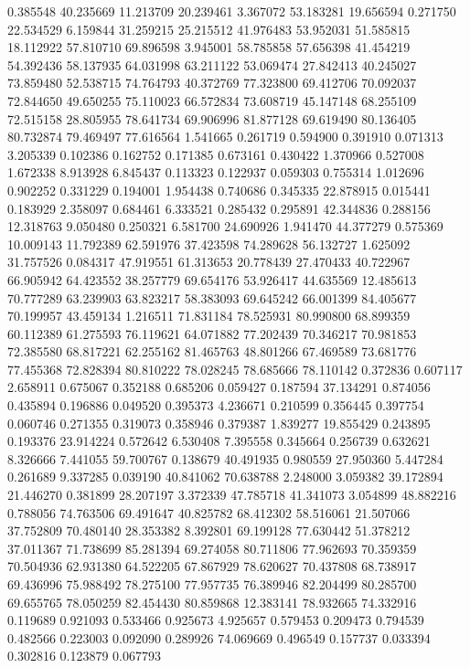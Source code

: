 0.385548
40.235669
11.213709
20.239461
3.367072
53.183281
19.656594
0.271750
22.534529
6.159844
31.259215
25.215512
41.976483
53.952031
51.585815
18.112922
57.810710
69.896598
3.945001
58.785858
57.656398
41.454219
54.392436
58.137935
64.031998
63.211122
53.069474
27.842413
40.245027
73.859480
52.538715
74.764793
40.372769
77.323800
69.412706
70.092037
72.844650
49.650255
75.110023
66.572834
73.608719
45.147148
68.255109
72.515158
28.805955
78.641734
69.906996
81.877128
69.619490
80.136405
80.732874
79.469497
77.616564
1.541665
0.261719
0.594900
0.391910
0.071313
3.205339
0.102386
0.162752
0.171385
0.673161
0.430422
1.370966
0.527008
1.672338
8.913928
6.845437
0.113323
0.122937
0.059303
0.755314
1.012696
0.902252
0.331229
0.194001
1.954438
0.740686
0.345335
22.878915
0.015441
0.183929
2.358097
0.684461
6.333521
0.285432
0.295891
42.344836
0.288156
12.318763
9.050480
0.250321
6.581700
24.690926
1.941470
44.377279
0.575369
10.009143
11.792389
62.591976
37.423598
74.289628
56.132727
1.625092
31.757526
0.084317
47.919551
61.313653
20.778439
27.470433
40.722967
66.905942
64.423552
38.257779
69.654176
53.926417
44.635569
12.485613
70.777289
63.239903
63.823217
58.383093
69.645242
66.001399
84.405677
70.199957
43.459134
1.216511
71.831184
78.525931
80.990800
68.899359
60.112389
61.275593
76.119621
64.071882
77.202439
70.346217
70.981853
72.385580
68.817221
62.255162
81.465763
48.801266
67.469589
73.681776
77.455368
72.828394
80.810222
78.028245
78.685666
78.110142
0.372836
0.607117
2.658911
0.675067
0.352188
0.685206
0.059427
0.187594
37.134291
0.874056
0.435894
0.196886
0.049520
0.395373
4.236671
0.210599
0.356445
0.397754
0.060746
0.271355
0.319073
0.358946
0.379387
1.839277
19.855429
0.243895
0.193376
23.914224
0.572642
6.530408
7.395558
0.345664
0.256739
0.632621
8.326666
7.441055
59.700767
0.138679
40.491935
0.980559
27.950360
5.447284
0.261689
9.337285
0.039190
40.841062
70.638788
2.248000
3.059382
39.172894
21.446270
0.381899
28.207197
3.372339
47.785718
41.341073
3.054899
48.882216
0.788056
74.763506
69.491647
40.825782
68.412302
58.516061
21.507066
37.752809
70.480140
28.353382
8.392801
69.199128
77.630442
51.378212
37.011367
71.738699
85.281394
69.274058
80.711806
77.962693
70.359359
70.504936
62.931380
64.522205
67.867929
78.620627
70.437808
68.738917
69.436996
75.988492
78.275100
77.957735
76.389946
82.204499
80.285700
69.655765
78.050259
82.454430
80.859868
12.383141
78.932665
74.332916
0.119689
0.921093
0.533466
0.925673
4.925657
0.579453
0.209473
0.794539
0.482566
0.223003
0.092090
0.289926
74.069669
0.496549
0.157737
0.033394
0.302816
0.123879
0.067793
